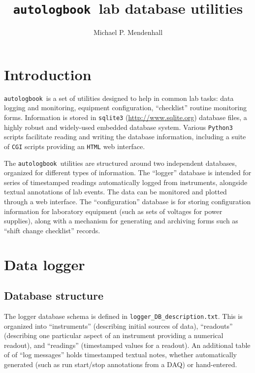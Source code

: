 \documentclass[12pt,english]{article}
\newcommand{\cd}[1]{\texttt{#1}}
\newcommand{\alb}{\cd{autologbook}}
\begin{document}
\title{\alb\ lab database utilities}
\author{Michael P. Mendenhall}
\maketitle
\tableofcontents

\section{Introduction}

\alb\ is a set of utilities designed to help in common lab tasks:
	data logging and monitoring, equipment configuration, ``checklist'' routine monitoring forms.
Information is stored in \cd{sqlite3} (\url{http://www.sqlite.org}) database files,
	a highly robust and widely-used embedded database system.
Various \cd{Python3} scripts facilitate reading and writing the database information,
	including a suite of \cd{CGI} scripts providing an \cd{HTML} web interface.

The \alb\ utilities are structured around two independent databases,
	organized for different types of information.
The ``logger'' database is intended for series of timestamped readings automatically logged
	from instruments, alongside textual annotations of lab events.
The data can be monitored and plotted through a web interface.
The ``configuration'' database is for storing configuration information for
	laboratory equipment (such as sets of voltages for power supplies),
	along with a mechanism for generating and archiving forms such as ``shift change checklist'' records.

%
%
%
\section{Data logger}

%
%
\subsection{Database structure}

The logger database schema is defined in \cd{logger\_DB\_description.txt}.
This is organized into ``instruments'' (describing initial sources of data),
	``readouts'' (describing one particular aspect of an instrument providing a numerical readout),
	and ``readings'' (timestamped values for a readout).
An additional table of of ``log messages'' holds timestamped textual notes,
	whether automatically generated (such as run start/stop annotations from a DAQ) or hand-entered.
\end{document}
